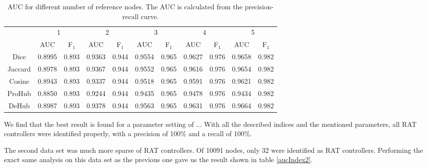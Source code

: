 \begin{table}[h!]
    \centering
    \caption{AUC for different number of reference nodes. The AUC is calculated from the precision-recall curve.}
    \begin{tabular}{|c||c|c||c|c||c|c||c|c||c|c|}
      \hline
      \multirow{2}{*}{~} 
            & \multicolumn{2}{c||}{1}
            & \multicolumn{2}{c||}{2}
            & \multicolumn{2}{c||}{3}
            & \multicolumn{2}{c||}{4}
            & \multicolumn{2}{|c|}{5} \\             \cline{2-11}
      ~     &AUC&F$_1$&AUC&F$_1$&AUC&F$_1$&AUC&F$_1$&AUC&F$_1$ \\ \hline
    Dice    &0.8995 & 0.893 & 0.9363 &0.944 &0.9554&0.965 & 0.9627 &0.976&0.9658 & 0.982 \\
    Jaccard &0.8978 & 0.893 & 0.9367 &0.944 &0.9552&0.965 & 0.9616 &0.976&0.9654 & 0.982 \\
    Cosine  &0.8943 & 0.893 & 0.9337 &0.944 &0.9518&0.965 & 0.9591 &0.976&0.9621 & 0.982 \\
    ProHub  &0.8850 & 0.893 & 0.9244 &0.944 &0.9435&0.965 & 0.9478 &0.976&0.9434 & 0.982 \\
    DeHub   &0.8987 & 0.893 & 0.9378 &0.944 &0.9563&0.965 & 0.9631 &0.976&0.9664 & 0.982 \\ \hline
    \end{tabular}
    \label{aucIndex}
\end{table}


We find that the best result is found for a parameter setting of ... With all the described indices and the mentioned parameters, all RAT controllers were identified properly, with a precision of 100\% and a recall of 100\%.

    
The second data set was much more sparse of RAT controllers. Of 10091 nodes, only 32 were identified as RAT controllers. Performing the exact same analysis on this data set as the previous one gave us the result shown in table \ref{aucIndex2}.

